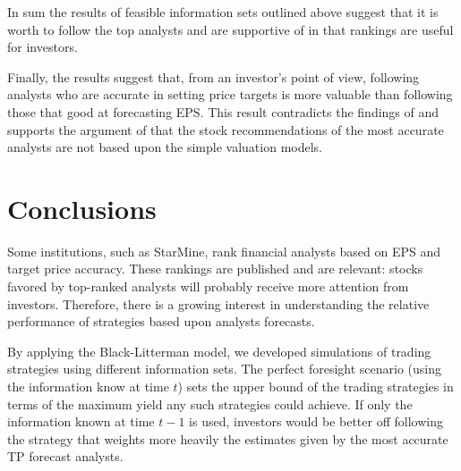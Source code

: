 \documentclass{article}\usepackage[]{graphicx}\usepackage[]{color}
\newcommand{\default}{\textit{all-time}}
\begin{document}
In sum the results of  feasible information sets outlined above suggest that  it is worth to follow the top analysts and are supportive of \cite{desai2000ass} in that rankings are useful for investors.





Finally, the results suggest that, from an investor's point of view, following analysts who are accurate in setting price targets is more valuable than following those that good at forecasting EPS.  This result contradicts the findings of \cite{bradshaw2004} and supports the argument of \cite{simon2011} that the stock recommendations of the most accurate analysts are not based upon the simple valuation models.

\section{Conclusions}
\label{sec:conclusion}

Some institutions, such as StarMine, rank financial analysts based on EPS and target price accuracy. These rankings are published and are relevant: stocks favored by top-ranked analysts will probably receive more attention from investors. Therefore, there is a growing interest in understanding the relative performance of strategies based upon analysts forecasts.

By applying the Black-Litterman model, we developed simulations of trading strategies using  different information sets. The perfect foresight scenario (using the information know at time $t$) sets the upper bound of the trading strategies in terms of the maximum yield any such strategies could achieve. If only the information known at time $t-1$ is used, investors would be better off following the strategy that weights more heavily the estimates given by the most accurate TP forecast analysts.
\end{document}
